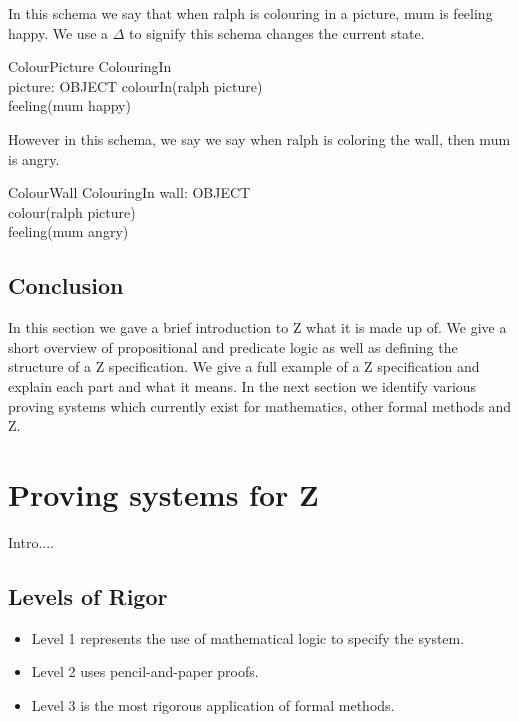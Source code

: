 In this schema we say that when ralph is colouring in a picture, mum is feeling happy. We use a $\Delta$ to signify this schema changes the current state.
\begin{schema}{ColourPicture}
\Delta ColouringIn \\
picture: OBJECT 
\where
colourIn(ralph \mapsto picture) \\
feeling(mum \mapsto happy)
\end{schema}

However in this schema, we say we say when ralph is coloring the wall, then mum is angry.
\begin{schema}{ColourWall}
\Delta ColouringIn
wall: OBJECT \\
\where
colour(ralph \mapsto picture) \\
feeling(mum \mapsto angry)
\end{schema}

\subsection{Conclusion}

In this section we gave a brief introduction to Z what it is made up of. We give a short overview of propositional and predicate logic as well as defining the structure of a Z specification. We give a full example of a Z specification and explain each part and what it means. In the next section we identify various proving systems which currently exist for mathematics, other formal methods and Z.

\section{Proving systems for Z}

Intro....

\subsection{Levels of Rigor}

\begin{itemize}
\item Level 1 represents the use of mathematical logic to specify the system.
\item Level 2 uses pencil-and-paper proofs.
\item Level 3 is the most rigorous application of formal methods.

\end{itemize}

